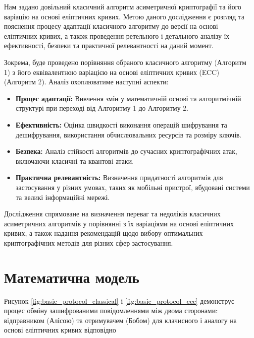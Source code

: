 \documentclass[12pt]{report}
\begin{document}
Нам задано довільний класичний алгоритм асиметричної криптографії та його варіацію на основі еліптичних кривих. Метою даного дослідження є розгляд та пояснення процесу адаптації класичного алгоритму до версії на основі еліптичних кривих, а також проведення ретельного і детального аналізу їх ефективності, безпеки та практичної релевантності на даний момент.

Зокрема, буде проведено порівняння обраного класичного алгоритму (Алгоритм 1) з його еквівалентною варіацією на основі еліптичних кривих (ECC) (Алгоритм 2). Аналіз охоплюватиме наступні аспекти:
\begin{itemize}
    \item \textbf{Процес адаптації:} Вивчення змін у математичній основі та алгоритмічній структурі при переході від Алгоритму 1 до Алгоритму 2.
    \item \textbf{Ефективність:} Оцінка швидкості виконання операцій шифрування та дешифрування, використання обчислювальних ресурсів та розміру ключів.
    \item \textbf{Безпека:} Аналіз стійкості алгоритмів до сучасних криптографічних атак, включаючи класичні та квантові атаки.
    \item \textbf{Практична релевантність:} Визначення придатності алгоритмів для застосування у різних умовах, таких як мобільні пристрої, вбудовані системи та великі інформаційні мережі.
\end{itemize}

Дослідження спрямоване на визначення переваг та недоліків класичних асиметричних алгоритмів у порівнянні з їх варіаціями на основі еліптичних кривих, а також надання рекомендацій щодо вибору оптимальних криптографічних методів для різних сфер застосування.

\section{Математична модель}

Рисунок \ref{fig:basic_protocol_classical} і \ref{fig:basic_protocol_ecc} демонструє процес обміну зашифрованими повідомленнями між двома сторонами: відправником (Алісою) та отримувачем (Бобом) для клачисного і аналогу на основі еліптичних кривих відповідно
\end{document}
